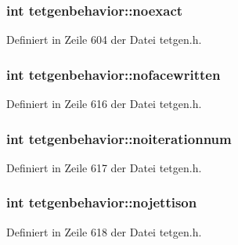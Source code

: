 \hypertarget{classtetgenbehavior_ad94cd345514f9e17b8d549fbba754ce5}{
\subsubsection[{noexact}]{\setlength{\rightskip}{0pt plus 5cm}int tetgenbehavior\-::noexact}}\label{classtetgenbehavior_ad94cd345514f9e17b8d549fbba754ce5}


Definiert in Zeile 604 der Datei tetgen.\-h.

\hypertarget{classtetgenbehavior_aad6591ecc02e25b3c747969e2a993185}{
\subsubsection[{nofacewritten}]{\setlength{\rightskip}{0pt plus 5cm}int tetgenbehavior\-::nofacewritten}}\label{classtetgenbehavior_aad6591ecc02e25b3c747969e2a993185}


Definiert in Zeile 616 der Datei tetgen.\-h.

\hypertarget{classtetgenbehavior_ab9cae975c0942ec0c87f3cb1915fb5b5}{
\subsubsection[{noiterationnum}]{\setlength{\rightskip}{0pt plus 5cm}int tetgenbehavior\-::noiterationnum}}\label{classtetgenbehavior_ab9cae975c0942ec0c87f3cb1915fb5b5}


Definiert in Zeile 617 der Datei tetgen.\-h.

\hypertarget{classtetgenbehavior_a765940ca096a051a7cf02f146147304c}{
\subsubsection[{nojettison}]{\setlength{\rightskip}{0pt plus 5cm}int tetgenbehavior\-::nojettison}}\label{classtetgenbehavior_a765940ca096a051a7cf02f146147304c}


Definiert in Zeile 618 der Datei tetgen.\-h.

